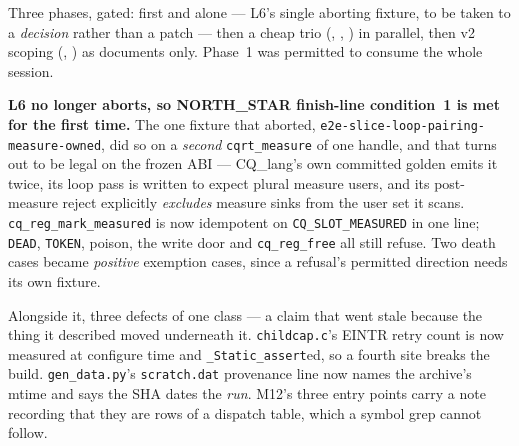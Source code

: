 Three phases, gated:  first and alone --- L6's single aborting fixture, to be taken
to a \emph{decision} rather than a patch --- then a cheap trio (, ,
) in parallel, then v2 scoping (, ) as documents only. Phase~1
was permitted to consume the whole session.

\textbf{L6 no longer aborts, so NORTH\_STAR finish-line condition~1 is met for the first
time.} The one fixture that aborted,
\texttt{e2e-slice-loop-pairing-measure-owned}, did so on a \emph{second}
\texttt{cqrt\_measure} of one handle, and that turns out to be legal on the frozen ABI ---
CQ\_lang's own committed golden emits it twice, its loop pass is written to expect plural
measure users, and its post-measure reject explicitly \emph{excludes} measure sinks from the
user set it scans. \texttt{cq\_reg\_mark\_measured} is now idempotent on
\texttt{CQ\_SLOT\_MEASURED} in one line; \texttt{DEAD}, \texttt{TOKEN}, poison, the write door
and \texttt{cq\_reg\_free} all still refuse. Two death cases became \emph{positive} exemption
cases, since a refusal's permitted direction needs its own fixture.

Alongside it, three defects of one class --- a claim that went stale because the thing it
described moved underneath it. \texttt{childcap.c}'s EINTR retry count is now measured at
configure time and \texttt{\_Static\_assert}ed, so a fourth site breaks the build.
\texttt{gen\_data.py}'s \texttt{scratch.dat} provenance line now names the archive's mtime and
says the SHA dates the \emph{run}. M12's three entry points carry a note recording that they
are rows of a dispatch table, which a symbol grep cannot follow.

\begin{figures}
\end{figures}

